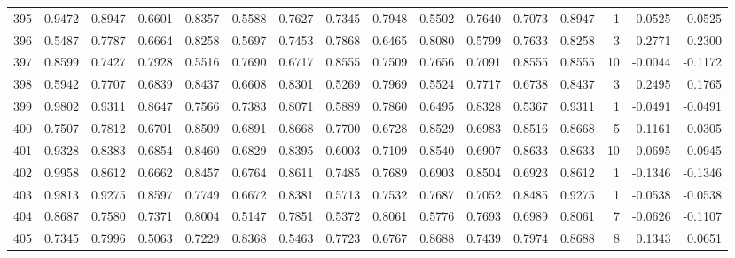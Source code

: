 \begin{tabular}{lrrrrrrrrrrrrrrr}
395 &      0.9472 &  0.8947 &  0.6601 &  0.8357 &  0.5588 &  0.7627 &  0.7345 &  0.7948 &  0.5502 &  0.7640 &   0.7073 &     0.8947 &      1 &                   -0.0525 &                    -0.0525 \\
396 &      0.5487 &  0.7787 &  0.6664 &  0.8258 &  0.5697 &  0.7453 &  0.7868 &  0.6465 &  0.8080 &  0.5799 &   0.7633 &     0.8258 &      3 &                    0.2771 &                     0.2300 \\
397 &      0.8599 &  0.7427 &  0.7928 &  0.5516 &  0.7690 &  0.6717 &  0.8555 &  0.7509 &  0.7656 &  0.7091 &   0.8555 &     0.8555 &     10 &                   -0.0044 &                    -0.1172 \\
398 &      0.5942 &  0.7707 &  0.6839 &  0.8437 &  0.6608 &  0.8301 &  0.5269 &  0.7969 &  0.5524 &  0.7717 &   0.6738 &     0.8437 &      3 &                    0.2495 &                     0.1765 \\
399 &      0.9802 &  0.9311 &  0.8647 &  0.7566 &  0.7383 &  0.8071 &  0.5889 &  0.7860 &  0.6495 &  0.8328 &   0.5367 &     0.9311 &      1 &                   -0.0491 &                    -0.0491 \\
400 &      0.7507 &  0.7812 &  0.6701 &  0.8509 &  0.6891 &  0.8668 &  0.7700 &  0.6728 &  0.8529 &  0.6983 &   0.8516 &     0.8668 &      5 &                    0.1161 &                     0.0305 \\
401 &      0.9328 &  0.8383 &  0.6854 &  0.8460 &  0.6829 &  0.8395 &  0.6003 &  0.7109 &  0.8540 &  0.6907 &   0.8633 &     0.8633 &     10 &                   -0.0695 &                    -0.0945 \\
402 &      0.9958 &  0.8612 &  0.6662 &  0.8457 &  0.6764 &  0.8611 &  0.7485 &  0.7689 &  0.6903 &  0.8504 &   0.6923 &     0.8612 &      1 &                   -0.1346 &                    -0.1346 \\
403 &      0.9813 &  0.9275 &  0.8597 &  0.7749 &  0.6672 &  0.8381 &  0.5713 &  0.7532 &  0.7687 &  0.7052 &   0.8485 &     0.9275 &      1 &                   -0.0538 &                    -0.0538 \\
404 &      0.8687 &  0.7580 &  0.7371 &  0.8004 &  0.5147 &  0.7851 &  0.5372 &  0.8061 &  0.5776 &  0.7693 &   0.6989 &     0.8061 &      7 &                   -0.0626 &                    -0.1107 \\
405 &      0.7345 &  0.7996 &  0.5063 &  0.7229 &  0.8368 &  0.5463 &  0.7723 &  0.6767 &  0.8688 &  0.7439 &   0.7974 &     0.8688 &      8 &                    0.1343 &                     0.0651 \\

\end{tabular}
